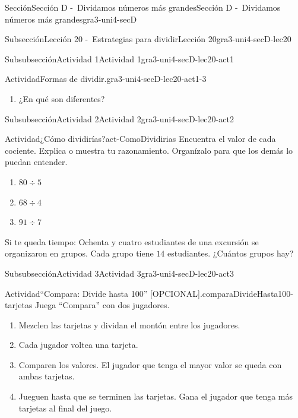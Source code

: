 \documentclass[twoside,10pt,]{article}
\begin{document}
\begin{sectionptx}{Sección}{Sección D -~Dividamos números más grandes}{}{Sección D -~Dividamos números más grandes}{}{}{gra3-uni4-secD}
\begin{subsectionptx}{Subsección}{Lección 20 -~Estrategias para dividir}{}{Lección 20}{}{}{gra3-uni4-secD-lec20}
\begin{subsubsectionptx}{Subsubsección}{Actividad 1}{}{Actividad 1}{}{}{gra3-uni4-secD-lec20-act1}
\begin{activity}{Actividad}{Formas de dividir.}{gra3-uni4-secD-lec20-act1-3}
\begin{enumerate}
\item{}¿En qué son diferentes?%
\end{enumerate}
\end{activity}%
\end{subsubsectionptx}
%
%
\typeout{************************************************}
\typeout{************************************************}
%
\begin{subsubsectionptx}{Subsubsección}{Actividad 2}{}{Actividad 2}{}{}{gra3-uni4-secD-lec20-act2}
\begin{activity}{Actividad}{¿Cómo dividirías?}{act-ComoDividirias}%
Encuentra el valor de cada cociente. Explica o muestra tu razonamiento. Organízalo para que los demás lo puedan entender.%
%
\begin{enumerate}
\item{}\(\displaystyle 80\div 5\)%
\item{}\(\displaystyle 68\div 4\)%
\item{}\(\displaystyle 91\div 7\)%
\end{enumerate}
Si te queda tiempo: Ochenta y cuatro estudiantes de una excursión se organizaron en grupos. Cada grupo tiene \(14\) estudiantes. ¿Cuántos grupos hay?%
\end{activity}%
\end{subsubsectionptx}
%
%
\typeout{************************************************}
\typeout{************************************************}
%
\begin{subsubsectionptx}{Subsubsección}{Actividad 3}{}{Actividad 3}{}{}{gra3-uni4-secD-lec20-act3}
\begin{activity}{Actividad}{“Compara: Divide hasta 100” [OPCIONAL].}{comparaDivideHasta100-tarjetas}%
Juega ``Compara'' con dos jugadores.%
%
\begin{enumerate}
\item{}Mezclen las tarjetas y dividan el montón entre los jugadores.%
\item{}Cada jugador voltea una tarjeta.%
\item{}Comparen los valores. El jugador que tenga el mayor valor se queda con ambas tarjetas.%
\item{}Jueguen hasta que se terminen las tarjetas. Gana el jugador que tenga más tarjetas al final del juego.%
\end{enumerate}
\end{activity}%
\end{subsubsectionptx}
%
%
\typeout{************************************************}

\end{subsectionptx}
\end{sectionptx}
\end{document}
